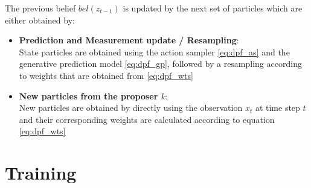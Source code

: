 \documentclass[10pt,twocolumn,letterpaper]{article}
\begin{document}
	The previous belief $bel(z_{t-1})$ is updated by the next set of particles which are either obtained by:
	\begin{itemize}
		\item \textbf{Prediction and Measurement update / Resampling}: \\
			State particles are obtained using the action sampler \ref{eq:dpf_as} and the generative prediction model \ref{eq:dpf_gp}, followed by a resampling according to weights that are obtained from \ref{eq:dpf_wts}
		\item \textbf{New particles from the proposer $k$}: \\
			New particles are obtained by directly using the observation $x_t$ at time step $t$ and their corresponding weights are calculated according to equation \ref{eq:dpf_wts}
	\end{itemize}
	
	\section{Training}
	
\end{document}
